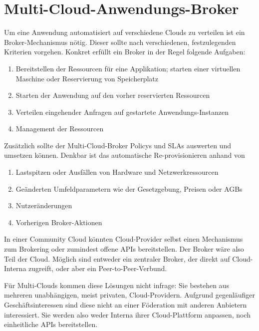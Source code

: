\chapter{Multi-Cloud-Anwendungs-Broker}


Um eine Anwendung automatisiert auf verschiedene Clouds zu verteilen ist ein Broker-Mechanismus nötig. Dieser sollte nach verschiedenen, festzulegenden Kriterien vorgehen. Konkret erfüllt ein Broker in der Regel folgende Aufgaben:

\begin{enumerate}
	\item Bereitstellen der Ressourcen für eine Applikation; starten einer virtuellen Maschine oder Reservierung von Speicherplatz
	\item Starten der Anwendung auf den vorher reservierten Ressourcen
	\item Verteilen eingehender Anfragen auf gestartete Anwendungs-Instanzen
	\item Management der Ressourcen
\end{enumerate}

\noindent
Zusätzlich sollte der Multi-Cloud-Broker Policys und SLAs auswerten und umsetzen können. Denkbar ist das automatische Re-provisionieren anhand von 

\begin{enumerate}
	\item Lastspitzen oder Ausfällen von Hardware und Netzwerkressourcen 
	\item Geänderten Umfeldparametern wie der Gesetzgebung, Preisen oder AGBs
	\item Nutzeränderungen
	\item Vorherigen Broker-Aktionen
\end{enumerate}

\noindent
In einer Community Cloud könnten Cloud-Provider selbst einen Mechanismus zum Brokering oder zumindest offene APIs bereitstellen. Der Broker wäre also Teil der Cloud. Möglich sind entweder ein zentraler Broker, der direkt auf Cloud-Interna zugreift, oder aber ein Peer-to-Peer-Verbund.

Für Multi-Clouds kommen diese Lösungen nicht infrage: Sie bestehen aus mehreren unabhängigen, meist privaten, Cloud-Providern. Aufgrund gegenläufiger Geschäftsinteressen sind diese nicht an einer Föderation mit anderen Anbietern interessiert. Sie werden also weder Interna ihrer Cloud-Plattform anpassen, noch einheitliche APIs bereitstellen.

